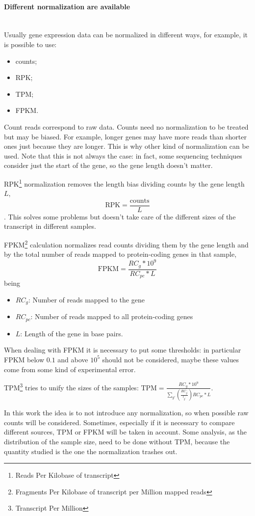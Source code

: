 \paragraph{Different normalization are available}\mbox{}\\
Usually gene expression data can be normalized in different ways, for example, it is possible to use:
\begin{itemize}
	\item counts;
	\item RPK;
	\item TPM;
	\item FPKM.
\end{itemize}
Count reads correspond to raw data. Counts need no normalization to be treated but may be biased. For example, longer genes may have more reads than shorter ones just because they are longer. This is why other kind of normalization can be used. Note that this is not always the case: in fact, some sequencing techniques consider just the start of the gene, so the gene length doesn't matter.   

RPK\footnote{Reads Per Kilobase of transcript} normalization removes the length bias dividing counts by the gene length $L$, \[\text{RPK}=\frac{\text{counts}}{L}\]. 
This solves some problems but doesn't take care of the different sizes of the transcript in different samples.

FPKM\footnote{Fragments Per Kilobase of transcript per Million mapped reads} calculation normalizes read counts dividing them by the gene length and by the total number of reads mapped to protein-coding genes in that sample,
\[
\text{FPKM} = \frac{RC_g*10^9}{RC_{pc}*L}
\]
being
\begin{itemize}
	\item $RC_g$: Number of reads mapped to the gene
	\item $RC_{pc}$: Number of reads mapped to all protein-coding genes
	\item $L$: Length of the gene in base pairs.
\end{itemize}
When dealing with FPKM it is necessary to put some thresholds: in particular FPKM below $0.1$ and above $10^5$ should not be considered, maybe these values come from some kind of experimental error.

TPM\footnote{Transcript Per Million} tries to unify the sizes of the samples: $\text{TPM} = \frac{RC_g*10^9}{\sum_{g\prime} \left(\frac{RC_{g^\prime}}{l_{g^\prime}}\right) RC_{pc}*L}$.

In this work the idea is to not introduce any normalization, so when possible raw counts will be considered. Sometimes, especially if it is necessary to compare different sources, TPM or FPKM will be taken in account. Some analysis, as the distribution of the sample size, need to be done without TPM, because the quantity studied is the one the normalization trashes out.

